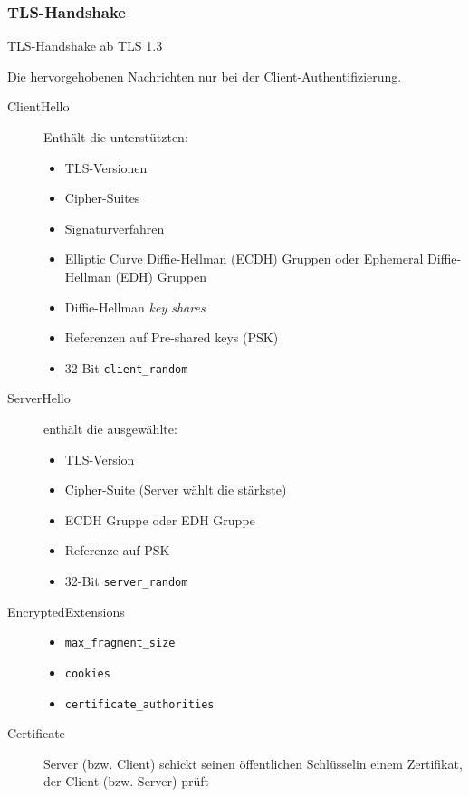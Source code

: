 \documentclass[a4paper,landscape]{article}
\begin{document}
\begin{multicols*}{4}
	\subsubsection{TLS-Handshake}
	\begin{center}
		
		\footnotesize TLS-Handshake ab TLS 1.3
	\end{center}
	Die hervorgehobenen Nachrichten nur bei der Client-Authentifizierung.
	\columnbreak
	\begin{description}
		\item[ClientHello] Enthält die unterstützten:
		      \begin{itemize}[leftmargin=0pt]
			      \item TLS-Versionen
			      \item Cipher-Suites
			      \item Signaturverfahren
			      \item Elliptic Curve Diffie-Hellman (ECDH) Gruppen oder
			            Ephemeral Diffie-Hellman (EDH) Gruppen
			      \item Diffie-Hellman \emph{key shares}
			      \item Referenzen auf Pre-shared keys (PSK)
			      \item 32-Bit \texttt{client\_random}
		      \end{itemize}
		\item[ServerHello] enthält die ausgewählte:
		      \begin{itemize}[leftmargin=0pt]
			      \item TLS-Version
			      \item Cipher-Suite (Server wählt die stärkste)
			      \item ECDH Gruppe oder EDH Gruppe
			      \item Referenze auf PSK
			      \item 32-Bit \texttt{server\_random}
		      \end{itemize}
		\item[EncryptedExtensions] \;
		      \begin{itemize}[leftmargin=0pt]
			      \item \texttt{max\_fragment\_size}
			      \item \texttt{cookies}
			      \item \texttt{certificate\_authorities}
		      \end{itemize}
		\item[Certificate] Server (bzw. Client) schickt seinen öffentlichen
		      Schlüsselin einem Zertifikat, der Client (bzw. Server) prüft

\end{description}
\end{multicols*}
\end{document}
